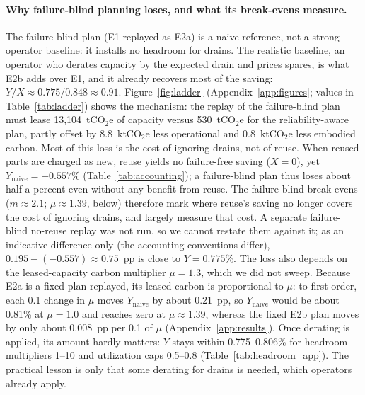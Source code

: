 \documentclass{article} %
\begin{document}
\paragraph{Why failure-blind planning loses, and what its break-evens measure.} The failure-blind plan (E1 replayed as E2a) is a naive reference, not a strong operator baseline: it installs no headroom for drains. The realistic baseline, an operator who derates capacity by the expected drain and prices spares, is what E2b adds over E1, and it already recovers most of the saving: $Y/X \approx 0.775/0.848 \approx 0.91$. Figure~\ref{fig:ladder} (Appendix~\ref{app:figures}; values in Table~\ref{tab:ladder}) shows the mechanism: the replay of the failure-blind plan must lease 13,104~tCO$_2$e of capacity versus 530~tCO$_2$e for the reliability-aware plan, partly offset by 8.8~ktCO$_2$e less operational and 0.8~ktCO$_2$e less embodied carbon. Most of this loss is the cost of ignoring drains, not of reuse. When reused parts are charged as new, reuse yields no failure-free saving ($X=0$), yet $Y_{\text{naive}}=-0.557\%$ (Table~\ref{tab:accounting}); a failure-blind plan thus loses about half a percent even without any benefit from reuse. The failure-blind break-evens ($m\approx 2.1$; $\mu\approx 1.39$, below) therefore mark where reuse's saving no longer covers the cost of ignoring drains, and largely measure that cost. A separate failure-blind no-reuse replay was not run, so we cannot restate them against it; as an indicative difference only (the accounting conventions differ), $0.195-(-0.557)\approx 0.75$~pp is close to $Y=0.775\%$. The loss also depends on the leased-capacity carbon multiplier $\mu=1.3$, which we did not sweep. Because E2a is a fixed plan replayed, its leased carbon is proportional to $\mu$: to first order, each 0.1 change in $\mu$ moves $Y_{\text{naive}}$ by about 0.21~pp, so $Y_{\text{naive}}$ would be about 0.81\% at $\mu=1.0$ and reaches zero at $\mu\approx 1.39$, whereas the fixed E2b plan moves by only about 0.008~pp per 0.1 of $\mu$ (Appendix~\ref{app:results}). Once derating is applied, its amount hardly matters: $Y$ stays within 0.775--0.806\% for headroom multipliers 1--10 and utilization caps 0.5--0.8 (Table~\ref{tab:headroom_app}). The practical lesson is only that some derating for drains is needed, which operators already apply.
\end{document}
